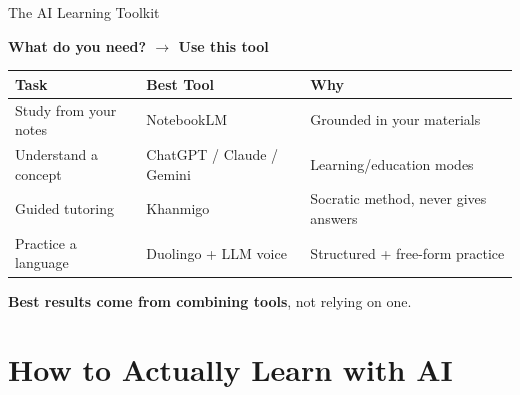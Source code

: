 \documentclass[aspectratio=169]{beamer}
\begin{document}
\begin{frame}{The AI Learning Toolkit}

\begin{center}
\textbf{\color{popblue}\large What do you need? $\to$ Use this tool}
\end{center}

\bigskip
\begin{center}
\small
\begin{tabular}{@{}l l l@{}}
\toprule
\textbf{Task} & \textbf{Best Tool} & \textbf{Why} \\
\midrule
Study from your notes & NotebookLM & Grounded in your materials \\[3pt]
Understand a concept & ChatGPT / Claude / Gemini & Learning/education modes \\[3pt]
Guided tutoring & Khanmigo & Socratic method, never gives answers \\[3pt]
Practice a language & Duolingo + LLM voice & Structured + free-form practice \\
\bottomrule
\end{tabular}
\end{center}

\bigskip
\begin{center}
\textbf{Best results come from \textcolor{paramgreen}{combining tools}}, not relying on one.
\end{center}
\end{frame}

\section{How to Actually Learn with AI}
\end{document}
